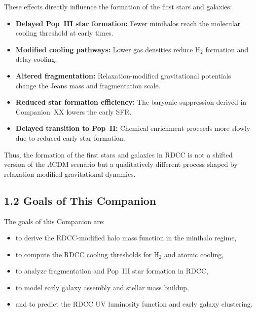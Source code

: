 \documentclass[11pt,a4paper]{article}
\begin{document}
These effects directly influence the formation of the first stars and galaxies:

\begin{itemize}
    \item \textbf{Delayed Pop~III star formation:}  
    Fewer minihalos reach the molecular cooling threshold at early times.

    \item \textbf{Modified cooling pathways:}  
    Lower gas densities reduce $\mathrm{H}_2$ formation and delay cooling.

    \item \textbf{Altered fragmentation:}  
    Relaxation-modified gravitational potentials change the Jeans mass and fragmentation scale.

    \item \textbf{Reduced star formation efficiency:}  
    The baryonic suppression derived in Companion~XX lowers the early SFR.

    \item \textbf{Delayed transition to Pop~II:}  
    Chemical enrichment proceeds more slowly due to reduced early star formation.
\end{itemize}

Thus, the formation of the first stars and galaxies in RDCC is not a shifted version of the 
$\Lambda$CDM scenario but a qualitatively different process shaped by relaxation-modified 
gravitational dynamics.

\subsection*{1.2 Goals of This Companion}

The goals of this Companion are:

\begin{itemize}
    \item to derive the RDCC-modified halo mass function in the minihalo regime,
    \item to compute the RDCC cooling thresholds for $\mathrm{H}_2$ and atomic cooling,
    \item to analyze fragmentation and Pop~III star formation in RDCC,
    \item to model early galaxy assembly and stellar mass buildup,
    \item and to predict the RDCC UV luminosity function and early galaxy clustering.
\end{itemize}
\end{document}
